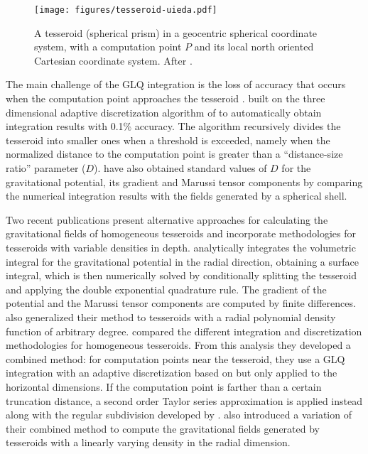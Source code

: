 \documentclass[extra, referee]{gji}
\begin{document}
\begin{figure}
\centering
\texttt{[image: figures/tesseroid-uieda.pdf]}
\caption{
    A tesseroid (spherical prism) in a geocentric spherical coordinate system, with a
    computation point $P$ and its local north oriented Cartesian coordinate system.
    After \citet{Uieda2015}.
}
\label{fig:tesseroid}
\end{figure}

The main challenge of the GLQ integration is the loss of accuracy that occurs when the
computation point approaches the tesseroid \citep{Ku1977}.
\citet{Uieda2016} built on the three dimensional adaptive discretization algorithm of
\citet{Li2011} to automatically obtain integration results with 0.1\% accuracy.
The algorithm recursively divides the tesseroid into smaller ones when a
threshold is exceeded,
namely when the normalized distance to the computation point is greater than a
``distance-size ratio'' parameter ($D$).
\citet{Uieda2016} have also obtained standard values of $D$
for the gravitational potential, its gradient and Marussi tensor components
by comparing the numerical integration results with the fields generated by a spherical
shell.

Two recent publications present alternative approaches for calculating the gravitational
fields of homogeneous tesseroids and incorporate methodologies for tesseroids with
variable densities in depth.
\citet{Fukushima2018} analytically integrates the volumetric integral for the
gravitational potential in the radial direction, obtaining a surface integral, which is
then numerically solved by conditionally splitting the tesseroid and applying the double
exponential quadrature rule.
The gradient of the potential and the Marussi tensor components are computed by finite
differences.
\citet{Fukushima2018} also generalized their method to tesseroids with a radial
polynomial density function of arbitrary degree.
\citet{Lin2018} compared the different integration and discretization methodologies for
homogeneous tesseroids.
From this analysis they developed a combined method:
for computation points near the tesseroid, they use a GLQ integration with an adaptive
discretization based on \citet{Uieda2016} but only applied to the horizontal dimensions.
If the computation point is farther than a certain truncation distance,
a second order Taylor series approximation is applied instead along with the regular
subdivision developed by \citet{Grombein2013}.
\citet{Lin2018} also introduced a variation of their combined method to compute the
gravitational fields generated by tesseroids with a linearly varying density in the
radial dimension.
\end{document}
